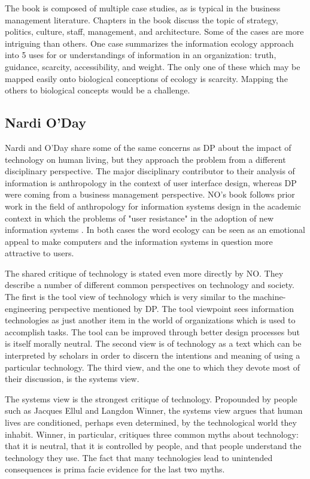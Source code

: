 The book is composed of multiple case studies, as is typical in the business management literature. Chapters in the book discuss the topic of strategy, politics, culture, staff, management, and architecture. Some of the cases are more intriguing than others. One case summarizes the information ecology approach into 5 uses for or understandings of information in an organization: truth, guidance, scarcity, accessibility, and weight. The only one of these which may be mapped easily onto biological conceptions of ecology is scarcity. Mapping the others to biological concepts would be a challenge.

\subsection{Nardi O'Day}

Nardi and O'Day share some of the same concerns as DP about the impact of technology on human living, but they approach the problem from a different disciplinary perspective. The major disciplinary contributor to their analysis of information is anthropology in the context of user interface design, whereas DP were coming from a business management perspective. NO's book follows prior work in the field of anthropology for information systems design in the academic context in which the problems of "user resistance" in the adoption of new information systems \cite{star_1996}. In both cases the word ecology can be seen as an emotional appeal to make computers and the information systems in question more attractive to users.

The shared critique of technology is stated even more directly by NO. They describe a number of different common perspectives on technology and society. The first is the tool view of technology which is very similar to the machine-engineering perspective mentioned by DP. The tool viewpoint sees information technologies as just another item in the world of organizations which is used to accomplish tasks. The tool can be improved through better design processes but is itself morally neutral. The second view is of technology as a text which can be interpreted by scholars in order to discern the intentions and meaning of using a particular technology. The third view, and the one to which they devote most of their discussion, is the systems view.

The systems view is the strongest critique of technology. Propounded by people such as Jacques Ellul and Langdon Winner, the systems view argues that human lives are conditioned, perhaps even determined, by the technological world they inhabit. Winner, in particular, critiques three common myths about technology: that it is neutral, that it is controlled by people, and that people understand the technology they use. The fact that many technologies lead to unintended consequences is prima facie evidence for the last two myths.

